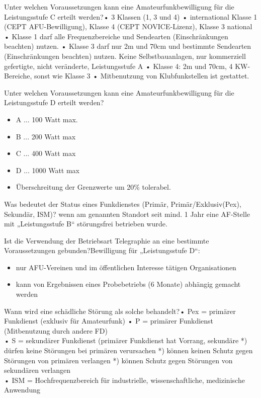 \documentclass[avery5371,grid,frame,a4paper]{flashcards}
\newcommand{\card}[3]{
  \begin{flashcard}[{\chap} -- #1]{#2}#3\end{flashcard}
}
\begin{document}
\card{44}{Unter welchen Voraussetzungen kann eine Amateurfunkbewilligung für die Leistungsstufe C erteilt werden?}{•  3 Klassen (1, 3 und 4) •  international Klasse 1 (CEPT AFU-Bewilligung), Klasse 4 (CEPT NOVICE-Lizenz), Klasse 3 national •  Klasse 1 darf alle Frequenzbereiche und Sendearten (Einschränkungen beachten) nutzen. •  Klasse 3 darf nur 2m und 70cm und bestimmte Sendearten (Einschränkungen beachten) nutzen. Keine Selbstbauanlagen, nur kommerziell gefertigte, nicht veränderte, Leistungsstufe A •  Klasse 4: 2m und 70cm, 4 KW-Bereiche, sonst wie Klasse 3 •  Mitbenutzung von Klubfunkstellen ist gestattet.}

\card{45}{Unter welchen Voraussetzungen kann eine Amateurfunkbewilligung für die Leistungsstufe D erteilt werden?}{\begin{itemize}\itemsep1pt \item A ... 100 Watt max. \item B ... 200 Watt max \item C ... 400 Watt max \item D ... 1000 Watt max \item Überschreitung der Grenzwerte um 20\% tolerabel.\end{itemize}}

\card{46}{Was bedeutet der Status eines Funkdienstes (Primär, Primär/Exklusiv(Pex), Sekundär, ISM)?}{ wenn am genannten Standort seit mind. 1 Jahr eine AF-Stelle mit „Leistungsstufe B“ störungsfrei betrieben wurde.}

\card{47}{Ist die Verwendung der Betriebsart Telegraphie an eine bestimmte Voraussetzungen gebunden?}{Bewilligung für „Leistungsstufe D“: \begin{itemize}\itemsep1pt \item nur AFU-Vereinen und im öffentlichen Interesse tätigen Organisationen \item kann von Ergebnissen eines Probebetriebs (6 Monate) abhängig gemacht werden\end{itemize}}

\card{48}{Wann wird eine schädliche Störung als solche behandelt?}{\small{• Pex = primärer Funkdienst (exklusiv für Amateurfunk) 
• P = primärer Funkdienst (Mitbenutzung durch andere FD) \\
• S = sekundärer Funkdienst (primärer Funkdienst hat Vorrang, sekundäre *) dürfen keine Störungen bei primären verursachen *) können keinen Schutz gegen Störungen von primären
verlangen *) können Schutz gegen Störungen von sekundären verlangen \\
• ISM = Hochfrequenzbereich für industrielle, wissenschaftliche, medizinische Anwendung}}
\end{document}
